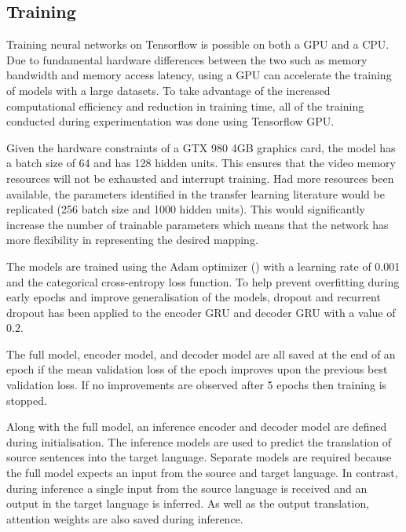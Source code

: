 \subsection{Training}
Training neural networks on Tensorflow is possible on both a GPU and a CPU. Due to fundamental hardware differences between the two such as memory bandwidth and memory access latency, using a GPU can accelerate the training of models with a large datasets. To take advantage of the increased computational efficiency and reduction in training time, all of the training conducted during experimentation was done using Tensorflow GPU.

Given the hardware constraints of a GTX 980 4GB graphics card, the model has a batch size of 64 and has 128 hidden units. This ensures that the video memory resources will not be exhausted and interrupt training. Had more resources been available, the parameters identified in the transfer learning literature would be replicated (256 batch size and 1000 hidden units). This would significantly increase the number of trainable parameters which means that the network has more flexibility in representing the desired mapping.

The models are trained using the Adam optimizer (\cite{adam_optimizer_2014}) with a learning rate of 0.001 and the categorical cross-entropy loss function. To help prevent overfitting during early epochs and improve generalisation of the models, dropout and recurrent dropout has been applied to the encoder \acrshort{GRU} and decoder \acrshort{GRU} with a value of $0.2$.

The full model, encoder model, and decoder model are all saved at the end of an epoch if the mean validation loss of the epoch improves upon the previous best validation loss. If no improvements are observed after 5 epochs then training is stopped.


Along with the full model, an inference encoder and decoder model are defined during initialisation. The inference models are used to predict the translation of source sentences into the target language. Separate models are required because the full model expects an input from the source and target language. In contrast, during inference a single input from the source language is received and an output in the target language is inferred. As well as the output translation, attention weights are also saved during inference.

